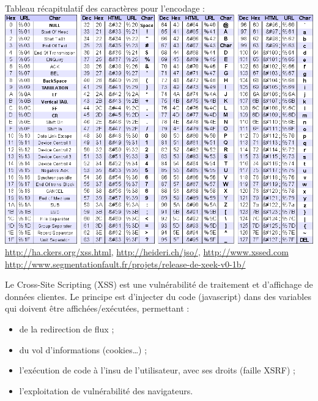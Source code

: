 \documentclass[a4paper,11pt]{article}				    %
\begin{document}
{Tableau r\'ecapitulatif des caract\`eres pour l'encodage :\\
\includegraphics[scale=0.545]{codes.png}
}
{
\url{http://ha.ckers.org/xss.html}, \url{http://heideri.ch/jso/}, \url{http://www.xssed.com}\\
\url{http://www.segmentationfault.fr/projets/release-de-xeek-v0-1b/}
}
{
\small
Le Cross-Site Scripting (XSS) est une vuln\'erabilit\'e de traitement et d'affichage de donn\'ees clientes.
Le principe est d'injecter du code (javascript) dans des variables qui doivent \^etre affich\'ees/ex\'ecut\'ees, permettant :
\begin{itemize}
	\item de la redirection de flux ;
	\item du vol d'informations (cookies\dots{}) ;
	\item l'ex\'ecution de code \`a l'insu de l'utilisateur, avec ses droits (faille XSRF) ;
	\item l'exploitation de vuln\'erabilit\'e des navigateurs.
\end{itemize}
}
\end{document}
